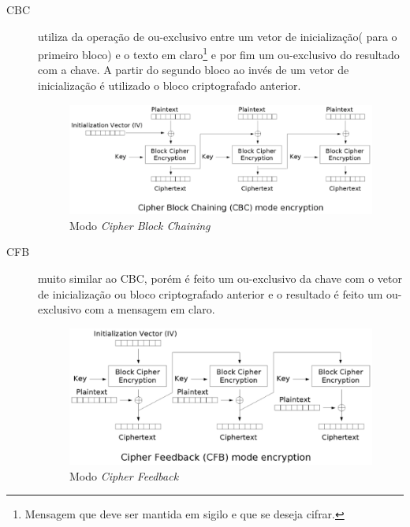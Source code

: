 \begin{description}
\begin{figure}[h]
\end{figure} 
\item[CBC] utiliza da operação de ou-exclusivo entre um vetor de inicialização( para o primeiro bloco) e o texto em claro\footnote{Mensagem que deve ser mantida em sigilo e que se deseja cifrar.} e por fim um ou-exclusivo do resultado com a chave. A partir do segundo bloco ao invés de um vetor de inicialização é utilizado o bloco criptografado anterior.
\begin{figure}[h]
\centering
\includegraphics[keepaspectratio=true,scale=0.7]
    {figuras/cbc.eps}
    \caption[Modo Cipher Block Chaining]{Modo \textit{Cipher Block Chaining}\protect\footnotemark}
\end{figure} 
\item[CFB] muito similar ao CBC, porém é feito um ou-exclusivo da chave com o vetor de inicialização ou bloco criptografado anterior e o resultado é feito um ou-exclusivo com a mensagem em claro.
\begin{figure}[h]
\centering
\includegraphics[keepaspectratio=true,scale=0.7]
    {figuras/cfb.eps}
    \caption[Modo Cipher Feedback]{Modo \textit{Cipher Feedback} \protect\footnotemark} 
\end{figure}

\end{description}
